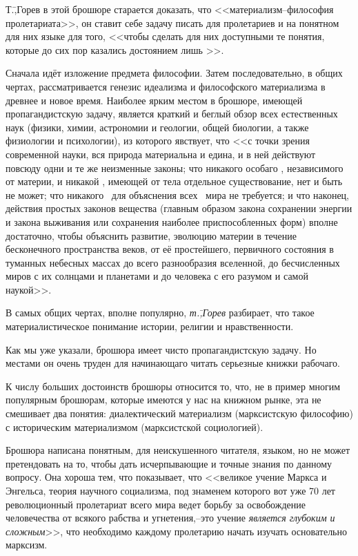 Т.\=,Горев в этой брошюре старается доказать, что <<материализм\---философия пролетариата>>, он ставит себе задачу писать для пролетариев и на понятном для них языке для того, <<чтобы сделать для них доступными те понятия, которые до сих пор казались достоянием лишь \grqq>>.

Сначала идёт изложение предмета философии. Затем последовательно, в общих чертах, рассматривается генезис идеализма и философского материализма в древнее и новое время. Наиболее ярким местом в брошюре, имеющей пропагандистскую задачу, является краткий и беглый обзор всех естественных наук (физики, химии, астрономии и геологии, общей биологии, а также физиологии и психологии), из которого явствует, что <<с точки зрения современной науки, вся природа материальна и едина, и в ней действуют повсюду одни и те же неизменные законы; что никакого особаго \grqq, независимого от материи, и никакой \grqq, имеющей от тела отдельное существование, нет и быть не может; что никакого \grqq\ для объяснения всех \grqq\ мира не требуется; и что наконец, действия простых законов вещества (главным образом закона сохранении энергии и закона выживания или сохранения наиболее приспособленных форм) вполне достаточно, чтобы объяснить развитие, эволюцию материи в течение бесконечного пространства веков, от её простейшего, первичного состояния в туманных небесных массах до всего разнообразия вселенной, до бесчисленных миров с их солнцами и планетами и до человека с его разумом и самой наукой>>.

В самых общих чертах, вполне популярно, \emph{т.\=,Горев} разбирает, что такое материалистическое понимание истории, религии и нравственности.

Как мы уже указали, брошюра имеет чисто пропагандистскую задачу. Но местами он очень труден для начинающаго читать серьезные книжки рабочаго.

К числу больших достоинств брошюры относится то, что, не в пример многим популярным брошюрам, которые имеются у нас на книжном рынке, эта не смешивает два понятия: диалектический материализм (марксистскую философию) с историческим материализмом (марксистской социологией).

Брошюра написана понятным, для неискушенного читателя, языком, но не может претендовать на то, чтобы дать исчерпывающие и точные знания по данному вопросу. Она хороша тем, что показывает, что <<великое учение Маркса и Энгельса, теория научного социализма, под знаменем которого вот уже 70 лет революционный пролетариат всего мира ведет борьбу за освобождение человечества от всякого рабства и угнетения,\---это учение \emph{является глубоким и сложным}>>, что необходимо каждому пролетарию начать изучать основательно марксизм.

